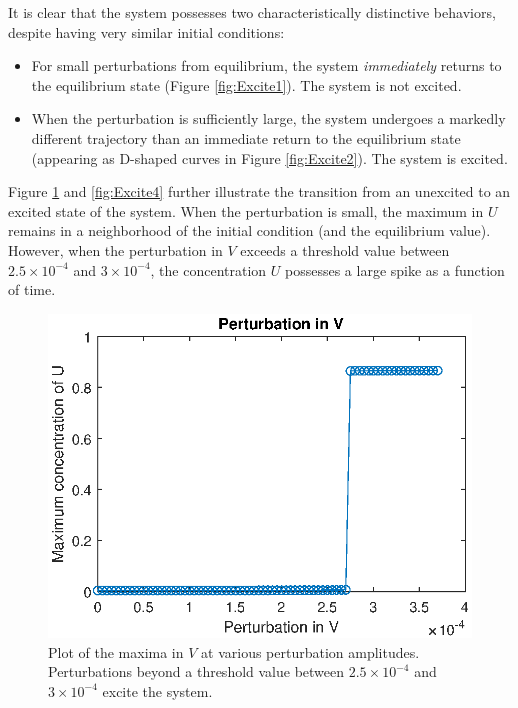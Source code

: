 \documentclass[twocolumn,amsmath,amssymb,aps]{revtex4}
\begin{document}
It is clear that the system possesses two characteristically distinctive behaviors, despite having very similar initial conditions:
\begin{itemize}
	\item For small perturbations from equilibrium, the system \textit{immediately} returns to the equilibrium state (Figure \ref{fig:Excite1}). The system is not excited.
	\item When the perturbation is sufficiently large, the system undergoes a markedly different trajectory than an immediate return to the equilibrium state (appearing as D-shaped curves in Figure \ref{fig:Excite2}). The system is excited.
\end{itemize}


Figure \ref{fig:Excite3} and \ref{fig:Excite4} further illustrate the transition from an unexcited to an excited state of the system. When the perturbation is small, the maximum in $U$ remains in a neighborhood of the initial condition (and the equilibrium value). However, when the perturbation in $V$ exceeds a threshold value between $2.5 \times 10^{-4}$ and $3 \times 10^{-4}$, the concentration $U$ possesses a large spike as a function of time. 


\begin{figure}[!htb]
	\centering
	\includegraphics[scale=0.6]{excite_2.eps}
	\caption{Plot of the maxima in $V$ at various perturbation amplitudes. Perturbations beyond a threshold value between $2.5\times 10^{-4}$ and $3\times 10^{-4}$ excite the system.}
	\label{fig:Excite3}
\end{figure}
\end{document}
